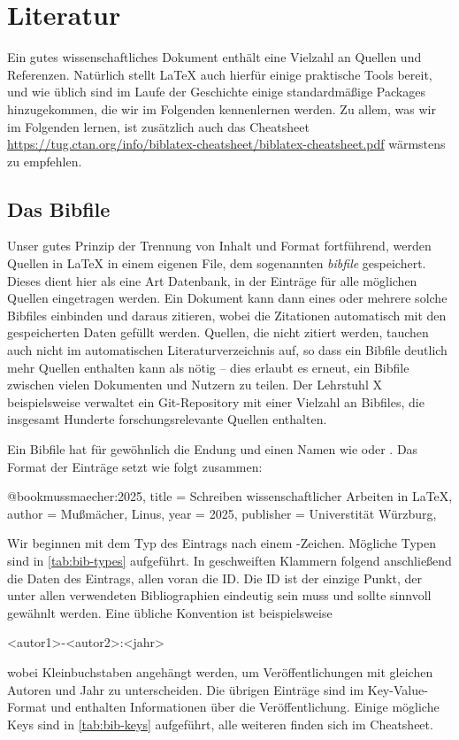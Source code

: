 \section{Literatur}

Ein gutes wissenschaftliches Dokument enthält eine Vielzahl an Quellen und Referenzen.
Natürlich stellt \LaTeX{} auch hierfür einige praktische Tools bereit, und wie üblich sind im Laufe der Geschichte einige standardmäßige Packages hinzugekommen, die wir im Folgenden kennenlernen werden.
Zu allem, was wir im Folgenden lernen, ist zusätzlich auch das Cheatsheet \url{https://tug.ctan.org/info/biblatex-cheatsheet/biblatex-cheatsheet.pdf} wärmstens zu empfehlen.

\subsection{Das Bibfile}
Unser gutes Prinzip der Trennung von Inhalt und Format fortführend, werden Quellen in \LaTeX{} in einem eigenen File, dem sogenannten \emph{bibfile} gespeichert.
Dieses dient hier als eine Art Datenbank, in der Einträge für alle möglichen Quellen eingetragen werden.
Ein Dokument kann dann eines oder mehrere solche Bibfiles einbinden und daraus zitieren, wobei die Zitationen automatisch mit den gespeicherten Daten gefüllt werden.
Quellen, die nicht zitiert werden, tauchen auch nicht im automatischen Literaturverzeichnis auf, so dass ein Bibfile deutlich mehr Quellen enthalten kann als nötig -- dies erlaubt es erneut, ein Bibfile zwischen vielen Dokumenten und Nutzern zu teilen.
Der Lehrstuhl X beispielsweise verwaltet ein Git-Repository mit einer Vielzahl an Bibfiles, die insgesamt Hunderte forschungsrelevante Quellen enthalten.

Ein Bibfile hat für gewöhnlich die Endung  und einen Namen wie  oder .
Das Format der Einträge setzt wie folgt zusammen:
\begin{latexlisting}
	@book{mussmaecher:2025,
		title = {Schreiben wissenschaftlicher Arbeiten in LaTeX},
		author = {Mußmächer, Linus},
		year = {2025},
		publisher = {Universtität Würzburg},
	}
\end{latexlisting}
Wir beginnen mit dem Typ des Eintrags nach einem \key{\@}-Zeichen.
Mögliche Typen sind in \autoref{tab:bib-types} aufgeführt.
In geschweiften Klammern folgend anschließend die Daten des Eintrags, allen voran die ID.
Die ID ist der einzige Punkt, der unter allen verwendeten Bibliographien eindeutig sein muss und sollte sinnvoll gewähnlt werden.
Eine übliche Konvention ist beispielsweise
\begin{latexlisting}
	<autor1>-<autor2>:<jahr>
\end{latexlisting}
wobei Kleinbuchstaben angehängt werden, um Veröffentlichungen mit gleichen Autoren und Jahr zu unterscheiden.
Die übrigen Einträge sind im Key-Value-Format und enthalten Informationen über die Veröffentlichung.
Einige mögliche Keys sind in \autoref{tab:bib-keys} aufgeführt, alle weiteren finden sich im Cheatsheet.

